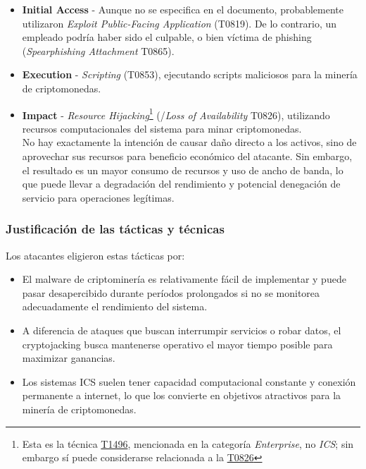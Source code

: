 \begin{itemize}
    \item \textbf{Initial Access} - Aunque no se especifica en el documento, probablemente utilizaron \textit{Exploit Public-Facing Application} (T0819). De lo contrario, un empleado podría haber sido el culpable, o bien víctima de phishing (\textit{Spearphishing Attachment} T0865).

        \item \textbf{Execution} - \textit{Scripting} (T0853), ejecutando scripts maliciosos para la minería de criptomonedas.
        
        \item \textbf{Impact} - \textit{Resource Hijacking}\footnote{Esta es la técnica \href{https://attack.mitre.org/techniques/T1496/}{T1496}, mencionada en la categoría \textit{Enterprise}, no \textit{ICS}; sin embargo sí puede considerarse relacionada a la \href{https://attack.mitre.org/techniques/T0826/}{T0826}} (/\textit{Loss of Availability} T0826), utilizando recursos computacionales del sistema para minar criptomonedas.\\
        No hay exactamente la intención de causar daño directo a los activos, sino de aprovechar sus recursos para beneficio económico del atacante.
        Sin embargo, el resultado es un mayor consumo de recursos y uso de ancho de banda, lo que puede llevar a degradación del rendimiento y potencial denegación de servicio para operaciones legítimas.
\end{itemize}

\subsubsection{Justificación de las tácticas y técnicas}
Los atacantes eligieron estas tácticas por:

\begin{itemize}
    
    \item El malware de criptominería es relativamente fácil de implementar y puede pasar desapercibido durante períodos prolongados si no se monitorea adecuadamente el rendimiento del sistema.
    
    \item A diferencia de ataques que buscan interrumpir servicios o robar datos, el cryptojacking busca mantenerse operativo el mayor tiempo posible para maximizar ganancias.
    
    \item Los sistemas ICS suelen tener capacidad computacional constante y conexión permanente a internet, lo que los convierte en objetivos atractivos para la minería de criptomonedas.

\end{itemize}

